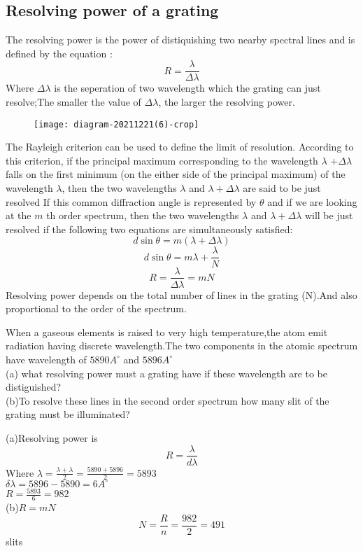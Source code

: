 \subsection{Resolving power of a grating}
The resolving power is the power of distiquishing two nearby spectral lines and is defined by the equation :
$$R=\frac{\lambda}{\Delta \lambda}$$
Where $\Delta \lambda$ is the seperation of two wavelength which the grating can just resolve;The smaller the value of $\Delta \lambda$, the larger the resolving power.\\
\begin{figure}[H]
	\centering
	\texttt{[image: diagram-20211221(6)-crop]}
	\caption{}
	\label{}
\end{figure}
The Rayleigh criterion can be used to define the limit of resolution. According to this criterion, if the principal maximum corresponding to the wavelength $\lambda$ $+\Delta \lambda$ falls on the first minimum (on the either side of the principal maximum) of the wavelength $\lambda$, then the two wavelengths $\lambda$ and $\lambda+\Delta \lambda$ are said to be just resolved  If this common diffraction angle is represented by $\theta$ and if we are looking at the $m$ th order spectrum, then the two wavelengths $\lambda$ and $\lambda+\Delta \lambda$ will be just resolved if the following two equations are simultaneously satisfied:
$$d \sin \theta=m(\lambda+\Delta \lambda)$$
$$d \sin \theta=m \lambda+\frac{\lambda}{N}$$
$$
R=\frac{\lambda}{\Delta \lambda}=m N
$$
Resolving power depends on the total number of lines in the grating (N).And also proportional to the order of the spectrum.
\begin{exercise}
	When a gaseous elements is raised to very high temperature,the atom emit radiation having discrete wavelength.The two components in the atomic spectrum have wavelength of $5890A^{\circ}$ and $5896A^{\circ}$\\
	(a) what resolving power must a grating have if these wavelength are to be distiguished?\\
	(b)To resolve these lines in the second order spectrum how many slit of the grating must be illuminated?
\end{exercise}
\begin{answer}
(a)Resolving power is 
$$R=\frac{\lambda}{d\lambda}$$
Where $\lambda=\frac{\lambda+\lambda}{2}=\frac{5890+5896}{2}=5893$\\
$\delta \lambda=5896-5890=6A^{\circ}$\\
$R=\frac{5893}{6}=982$\\
(b)$R=mN$\\
$$N=\frac{R}{n}	=\frac{982}{2}=491$$ slits
\end{answer}
